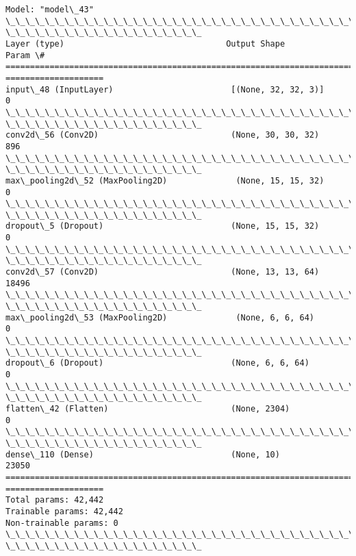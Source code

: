 \documentclass[11pt]{article}
\begin{document}
    \begin{Verbatim}[commandchars=\\\{\}]
Model: "model\_43"
\_\_\_\_\_\_\_\_\_\_\_\_\_\_\_\_\_\_\_\_\_\_\_\_\_\_\_\_\_\_\_\_\_\_\_\_\_\_\_\_\_\_\_\_\_\_\_\_\_\_\_\_\_\_\_\_\_\_\_\_\_\_\_\_\_\_\_\_\_\_\_\_\_\_\_\_\_\_\_\_
\_\_\_\_\_\_\_\_\_\_\_\_\_\_\_\_\_\_\_\_
Layer (type)                                 Output Shape
Param \#
================================================================================
====================
input\_48 (InputLayer)                        [(None, 32, 32, 3)]
0
\_\_\_\_\_\_\_\_\_\_\_\_\_\_\_\_\_\_\_\_\_\_\_\_\_\_\_\_\_\_\_\_\_\_\_\_\_\_\_\_\_\_\_\_\_\_\_\_\_\_\_\_\_\_\_\_\_\_\_\_\_\_\_\_\_\_\_\_\_\_\_\_\_\_\_\_\_\_\_\_
\_\_\_\_\_\_\_\_\_\_\_\_\_\_\_\_\_\_\_\_
conv2d\_56 (Conv2D)                           (None, 30, 30, 32)
896
\_\_\_\_\_\_\_\_\_\_\_\_\_\_\_\_\_\_\_\_\_\_\_\_\_\_\_\_\_\_\_\_\_\_\_\_\_\_\_\_\_\_\_\_\_\_\_\_\_\_\_\_\_\_\_\_\_\_\_\_\_\_\_\_\_\_\_\_\_\_\_\_\_\_\_\_\_\_\_\_
\_\_\_\_\_\_\_\_\_\_\_\_\_\_\_\_\_\_\_\_
max\_pooling2d\_52 (MaxPooling2D)              (None, 15, 15, 32)
0
\_\_\_\_\_\_\_\_\_\_\_\_\_\_\_\_\_\_\_\_\_\_\_\_\_\_\_\_\_\_\_\_\_\_\_\_\_\_\_\_\_\_\_\_\_\_\_\_\_\_\_\_\_\_\_\_\_\_\_\_\_\_\_\_\_\_\_\_\_\_\_\_\_\_\_\_\_\_\_\_
\_\_\_\_\_\_\_\_\_\_\_\_\_\_\_\_\_\_\_\_
dropout\_5 (Dropout)                          (None, 15, 15, 32)
0
\_\_\_\_\_\_\_\_\_\_\_\_\_\_\_\_\_\_\_\_\_\_\_\_\_\_\_\_\_\_\_\_\_\_\_\_\_\_\_\_\_\_\_\_\_\_\_\_\_\_\_\_\_\_\_\_\_\_\_\_\_\_\_\_\_\_\_\_\_\_\_\_\_\_\_\_\_\_\_\_
\_\_\_\_\_\_\_\_\_\_\_\_\_\_\_\_\_\_\_\_
conv2d\_57 (Conv2D)                           (None, 13, 13, 64)
18496
\_\_\_\_\_\_\_\_\_\_\_\_\_\_\_\_\_\_\_\_\_\_\_\_\_\_\_\_\_\_\_\_\_\_\_\_\_\_\_\_\_\_\_\_\_\_\_\_\_\_\_\_\_\_\_\_\_\_\_\_\_\_\_\_\_\_\_\_\_\_\_\_\_\_\_\_\_\_\_\_
\_\_\_\_\_\_\_\_\_\_\_\_\_\_\_\_\_\_\_\_
max\_pooling2d\_53 (MaxPooling2D)              (None, 6, 6, 64)
0
\_\_\_\_\_\_\_\_\_\_\_\_\_\_\_\_\_\_\_\_\_\_\_\_\_\_\_\_\_\_\_\_\_\_\_\_\_\_\_\_\_\_\_\_\_\_\_\_\_\_\_\_\_\_\_\_\_\_\_\_\_\_\_\_\_\_\_\_\_\_\_\_\_\_\_\_\_\_\_\_
\_\_\_\_\_\_\_\_\_\_\_\_\_\_\_\_\_\_\_\_
dropout\_6 (Dropout)                          (None, 6, 6, 64)
0
\_\_\_\_\_\_\_\_\_\_\_\_\_\_\_\_\_\_\_\_\_\_\_\_\_\_\_\_\_\_\_\_\_\_\_\_\_\_\_\_\_\_\_\_\_\_\_\_\_\_\_\_\_\_\_\_\_\_\_\_\_\_\_\_\_\_\_\_\_\_\_\_\_\_\_\_\_\_\_\_
\_\_\_\_\_\_\_\_\_\_\_\_\_\_\_\_\_\_\_\_
flatten\_42 (Flatten)                         (None, 2304)
0
\_\_\_\_\_\_\_\_\_\_\_\_\_\_\_\_\_\_\_\_\_\_\_\_\_\_\_\_\_\_\_\_\_\_\_\_\_\_\_\_\_\_\_\_\_\_\_\_\_\_\_\_\_\_\_\_\_\_\_\_\_\_\_\_\_\_\_\_\_\_\_\_\_\_\_\_\_\_\_\_
\_\_\_\_\_\_\_\_\_\_\_\_\_\_\_\_\_\_\_\_
dense\_110 (Dense)                            (None, 10)
23050
================================================================================
====================
Total params: 42,442
Trainable params: 42,442
Non-trainable params: 0
\_\_\_\_\_\_\_\_\_\_\_\_\_\_\_\_\_\_\_\_\_\_\_\_\_\_\_\_\_\_\_\_\_\_\_\_\_\_\_\_\_\_\_\_\_\_\_\_\_\_\_\_\_\_\_\_\_\_\_\_\_\_\_\_\_\_\_\_\_\_\_\_\_\_\_\_\_\_\_\_
\_\_\_\_\_\_\_\_\_\_\_\_\_\_\_\_\_\_\_\_
    \end{Verbatim}
\end{document}
